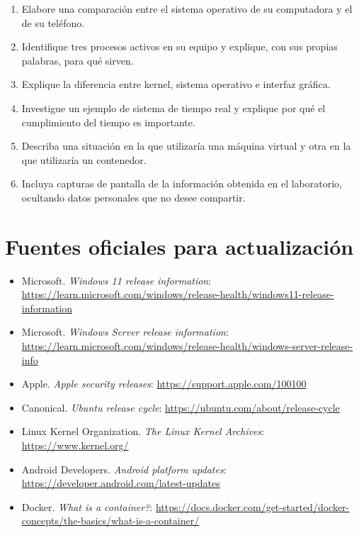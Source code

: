 \documentclass[
  spanish,
  letterpaper,
]{scrbook}
\providecommand{\tightlist}{%
  \setlength{\itemsep}{0pt}\setlength{\parskip}{0pt}}
\begin{document}
\begin{enumerate}
\def\labelenumi{\arabic{enumi}.}
\tightlist
\item
  Elabore una comparación entre el sistema operativo de su computadora y
  el de su teléfono.
\item
  Identifique tres procesos activos en su equipo y explique, con sus
  propias palabras, para qué sirven.
\item
  Explique la diferencia entre kernel, sistema operativo e interfaz
  gráfica.
\item
  Investigue un ejemplo de sistema de tiempo real y explique por qué el
  cumplimiento del tiempo es importante.
\item
  Describa una situación en la que utilizaría una máquina virtual y otra
  en la que utilizaría un contenedor.
\item
  Incluya capturas de pantalla de la información obtenida en el
  laboratorio, ocultando datos personales que no desee compartir.
\end{enumerate}


\chapter{Fuentes oficiales para
actualización}\label{fuentes-oficiales-para-actualizaciuxf3n}

\begin{itemize}
\tightlist
\item
  Microsoft. \emph{Windows 11 release information}:
  \url{https://learn.microsoft.com/windows/release-health/windows11-release-information}
\item
  Microsoft. \emph{Windows Server release information}:
  \url{https://learn.microsoft.com/windows/release-health/windows-server-release-info}
\item
  Apple. \emph{Apple security releases}:
  \url{https://support.apple.com/100100}
\item
  Canonical. \emph{Ubuntu release cycle}:
  \url{https://ubuntu.com/about/release-cycle}
\item
  Linux Kernel Organization. \emph{The Linux Kernel Archives}:
  \url{https://www.kernel.org/}
\item
  Android Developers. \emph{Android platform updates}:
  \url{https://developer.android.com/latest-updates}
\item
  Docker. \emph{What is a container?}:
  \url{https://docs.docker.com/get-started/docker-concepts/the-basics/what-is-a-container/}
\end{itemize}
\end{document}

